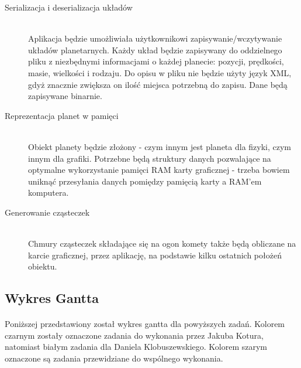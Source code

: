 \begin{description}
	\item[Serializacja i deserializacja układów] \hfill \\
	Aplikacja będzie umożliwiała użytkownikowi zapisywanie/wczytywanie układów planetarnych. Każdy układ będzie zapisywany do oddzielnego pliku z niezbędnymi informacjami o każdej planecie: pozycji, prędkości, masie, wielkości i rodzaju. Do opisu w pliku nie będzie użyty język XML, gdyż znacznie zwiększa on ilość miejsca potrzebną do zapisu. Dane będą zapisywane binarnie.
	\item[Reprezentacja planet w pamięci] \hfill \\
	Obiekt planety będzie złożony - czym innym jest planeta dla fizyki, czym innym dla grafiki. Potrzebne będą struktury danych pozwalające na optymalne wykorzystanie pamięci RAM karty graficznej - trzeba bowiem uniknąć przesyłania danych pomiędzy pamięcią karty a RAM'em komputera.
	\item[Generowanie cząsteczek] \hfill \\
	Chmury cząsteczek składające się na ogon komety także będą obliczane na karcie graficznej, przez aplikację, na podstawie kilku ostatnich położeń obiektu.
\end{description}

\subsection{Wykres Gantta}\label{sub:wykres gantta}

\paragraph{}

Poniższej przedstawiony został wykres gantta dla powyższych zadań. Kolorem czarnym zostały oznaczone zadania do wykonania przez Jakuba Kotura, natomiast białym zadania dla Daniela Klobuszewskiego. Kolorem szarym oznaczone są zadania przewidziane do wspólnego wykonania.


